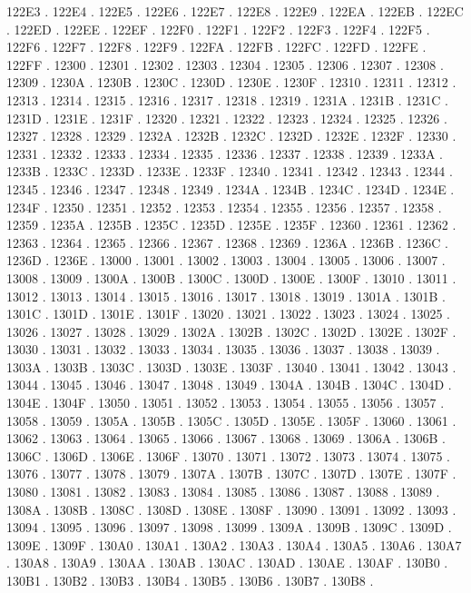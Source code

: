 122E3 .
122E4 .
122E5 .
122E6 .
122E7 .
122E8 .
122E9 .
122EA .
122EB .
122EC .
122ED .
122EE .
122EF .
122F0 .
122F1 .
122F2 .
122F3 .
122F4 .
122F5 .
122F6 .
122F7 .
122F8 .
122F9 .
122FA .
122FB .
122FC .
122FD .
122FE .
122FF .
12300 .
12301 .
12302 .
12303 .
12304 .
12305 .
12306 .
12307 .
12308 .
12309 .
1230A .
1230B .
1230C .
1230D .
1230E .
1230F .
12310 .
12311 .
12312 .
12313 .
12314 .
12315 .
12316 .
12317 .
12318 .
12319 .
1231A .
1231B .
1231C .
1231D .
1231E .
1231F .
12320 .
12321 .
12322 .
12323 .
12324 .
12325 .
12326 .
12327 .
12328 .
12329 .
1232A .
1232B .
1232C .
1232D .
1232E .
1232F .
12330 .
12331 .
12332 .
12333 .
12334 .
12335 .
12336 .
12337 .
12338 .
12339 .
1233A .
1233B .
1233C .
1233D .
1233E .
1233F .
12340 .
12341 .
12342 .
12343 .
12344 .
12345 .
12346 .
12347 .
12348 .
12349 .
1234A .
1234B .
1234C .
1234D .
1234E .
1234F .
12350 .
12351 .
12352 .
12353 .
12354 .
12355 .
12356 .
12357 .
12358 .
12359 .
1235A .
1235B .
1235C .
1235D .
1235E .
1235F .
12360 .
12361 .
12362 .
12363 .
12364 .
12365 .
12366 .
12367 .
12368 .
12369 .
1236A .
1236B .
1236C .
1236D .
1236E .
13000 .
13001 .
13002 .
13003 .
13004 .
13005 .
13006 .
13007 .
13008 .
13009 .
1300A .
1300B .
1300C .
1300D .
1300E .
1300F .
13010 .
13011 .
13012 .
13013 .
13014 .
13015 .
13016 .
13017 .
13018 .
13019 .
1301A .
1301B .
1301C .
1301D .
1301E .
1301F .
13020 .
13021 .
13022 .
13023 .
13024 .
13025 .
13026 .
13027 .
13028 .
13029 .
1302A .
1302B .
1302C .
1302D .
1302E .
1302F .
13030 .
13031 .
13032 .
13033 .
13034 .
13035 .
13036 .
13037 .
13038 .
13039 .
1303A .
1303B .
1303C .
1303D .
1303E .
1303F .
13040 .
13041 .
13042 .
13043 .
13044 .
13045 .
13046 .
13047 .
13048 .
13049 .
1304A .
1304B .
1304C .
1304D .
1304E .
1304F .
13050 .
13051 .
13052 .
13053 .
13054 .
13055 .
13056 .
13057 .
13058 .
13059 .
1305A .
1305B .
1305C .
1305D .
1305E .
1305F .
13060 .
13061 .
13062 .
13063 .
13064 .
13065 .
13066 .
13067 .
13068 .
13069 .
1306A .
1306B .
1306C .
1306D .
1306E .
1306F .
13070 .
13071 .
13072 .
13073 .
13074 .
13075 .
13076 .
13077 .
13078 .
13079 .
1307A .
1307B .
1307C .
1307D .
1307E .
1307F .
13080 .
13081 .
13082 .
13083 .
13084 .
13085 .
13086 .
13087 .
13088 .
13089 .
1308A .
1308B .
1308C .
1308D .
1308E .
1308F .
13090 .
13091 .
13092 .
13093 .
13094 .
13095 .
13096 .
13097 .
13098 .
13099 .
1309A .
1309B .
1309C .
1309D .
1309E .
1309F .
130A0 .
130A1 .
130A2 .
130A3 .
130A4 .
130A5 .
130A6 .
130A7 .
130A8 .
130A9 .
130AA .
130AB .
130AC .
130AD .
130AE .
130AF .
130B0 .
130B1 .
130B2 .
130B3 .
130B4 .
130B5 .
130B6 .
130B7 .
130B8 .
